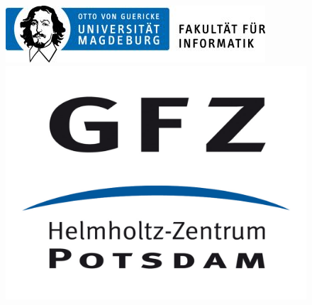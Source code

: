 \documentclass[thesis.tex]{subfiles}
\begin{document}
\begin{figure}[b]
	\includegraphics[width=.3\textwidth]{../pictures/corporate_design/FIN.jpg} \hfill
	\label{fig:FIN}
	\includegraphics[width=.2\textwidth]{../pictures/corporate_design/gfz.jpg}
	\label{fig:GFZ}
\end{figure}

\clearpage
\end{document}
